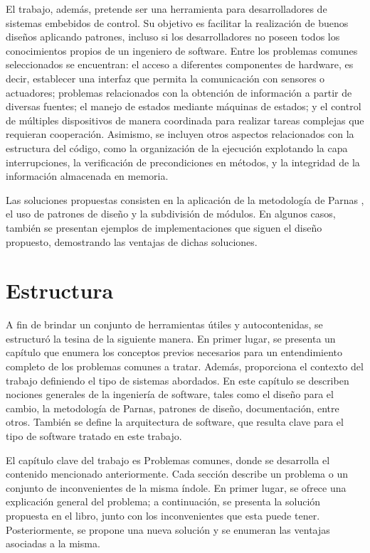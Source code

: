 El trabajo, además, pretende ser una herramienta para desarrolladores de sistemas embebidos de control. Su objetivo es facilitar la realización de buenos diseños aplicando patrones, incluso si los desarrolladores no poseen todos los conocimientos propios de un ingeniero de software. Entre los problemas comunes seleccionados se encuentran: el acceso a diferentes componentes de hardware, es decir, establecer una interfaz que permita la comunicación con sensores o actuadores; problemas relacionados con la obtención de información a partir de diversas fuentes; el manejo de estados mediante máquinas de estados; y el control de múltiples dispositivos de manera coordinada para realizar tareas complejas que requieran cooperación. Asimismo, se incluyen otros aspectos relacionados con la estructura del código, como la organización de la ejecución explotando la capa interrupciones, la verificación de precondiciones en métodos, y la integridad de la información almacenada en memoria.

Las soluciones propuestas consisten en la aplicación de la metodología de Parnas \cite{parnas72}, el uso de patrones de diseño y la subdivisión de módulos. En algunos casos, también se presentan ejemplos de implementaciones que siguen el diseño propuesto, demostrando las ventajas de dichas soluciones.

\section*{Estructura}

A fin de brindar un conjunto de herramientas útiles y autocontenidas, se estructuró la tesina de la siguiente manera. En primer lugar, se presenta un capítulo que enumera los conceptos previos necesarios para un entendimiento completo de los problemas comunes a tratar. Además, proporciona el contexto del trabajo definiendo el tipo de sistemas abordados. En este capítulo se describen nociones generales de la ingeniería de software, tales como el diseño para el cambio, la metodología de Parnas, patrones de diseño, documentación, entre otros. También se define la arquitectura de software, que resulta clave para el tipo de software tratado en este trabajo.

El capítulo clave del trabajo es Problemas comunes, donde se desarrolla el contenido mencionado anteriormente. Cada sección describe un problema o un conjunto de inconvenientes de la misma índole. En primer lugar, se ofrece una explicación general del problema; a continuación, se presenta la solución propuesta en el libro, junto con los inconvenientes que esta puede tener. Posteriormente, se propone una nueva solución y se enumeran las ventajas asociadas a la misma.



